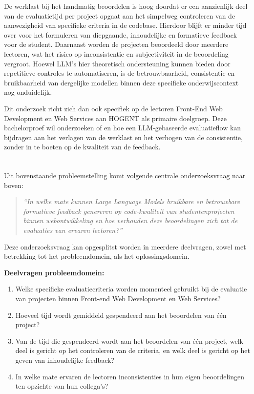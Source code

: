 \vspace{1em}

De werklast bij het handmatig beoordelen is hoog doordat er een aanzienlijk deel van de evaluatietijd per project opgaat aan het simpelweg controleren van de aanwezigheid van specifieke criteria in de codebase. Hierdoor blijft er minder tijd over voor het formuleren van diepgaande, inhoudelijke en formatieve feedback voor de student. Daarnaast worden de projecten beoordeeld door meerdere lectoren, wat het risico op inconsistentie en subjectiviteit in de beoordeling vergroot. Hoewel LLM's hier theoretisch ondersteuning kunnen bieden door repetitieve controles te automatiseren, is de betrouwbaarheid, consistentie en bruikbaarheid van dergelijke modellen binnen deze specifieke onderwijscontext nog onduidelijk.

\vspace{1em}

Dit onderzoek richt zich dan ook specifiek op de lectoren Front-End Web Development en Web Services aan HOGENT als primaire doelgroep. Deze bachelorproef wil onderzoeken of en hoe een LLM-gebaseerde evaluatieflow kan bijdragen aan het verlagen van de werklast en het verhogen van de consistentie, zonder in te boeten op de kwaliteit van de feedback.

\section{}%
\label{sec:onderzoeksvraag}

Uit bovenstaande probleemstelling komt volgende centrale onderzoeksvraag naar boven:

 \begin{quote}
    \textit{``In welke mate kunnen Large Language Models bruikbare en betrouwbare formatieve feedback genereren op code-kwaliteit van studentenprojecten binnen webontwikkeling en hoe verhouden deze beoordelingen zich tot de evaluaties van ervaren lectoren?''}
\end{quote}

Deze onderzoeksvraag kan opgesplitst worden in meerdere deelvragen, zowel met betrekking tot het probleemdomein, als het oplossingsdomein.

\textbf{\newline Deelvragen probleemdomein:}
\begin{enumerate}
    \item Welke specifieke evaluatiecriteria worden momenteel gebruikt bij de evaluatie van projecten binnen Front-end Web Development en Web Services?
    \item Hoeveel tijd wordt gemiddeld gespendeerd aan het beoordelen van één project?
    \item Van de tijd die gespendeerd wordt aan het beoordelen van één project, welk deel is gericht op het controleren van de criteria, en welk deel is gericht op het geven van inhoudelijke feedback?
    \item In welke mate ervaren de lectoren inconsistenties in hun eigen beoordelingen ten opzichte van hun collega's?
\end{enumerate}

